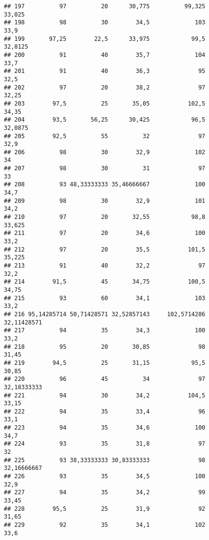 \documentclass[
]{article}
\begin{document}
\begin{verbatim}
## 197          97          20      30,775          99,325               33,025
## 198          98          30        34,5             103                 33,9
## 199       97,25        22,5      33,975            99,5              32,8125
## 200          91          40        35,7             104                 33,7
## 201          91          40        36,3              95                 32,5
## 202          97          20        38,2              97                32,25
## 203        97,5          25       35,05           102,5                34,35
## 204        93,5       56,25      30,425            96,5              32,0875
## 205        92,5          55          32              97                 32,9
## 206          98          30        32,9             102                   34
## 207          98          30          31              97                   33
## 208          93 48,33333333 35,46666667             100                 34,7
## 209          98          30        32,9             101                 34,2
## 210          97          20       32,55            98,8               33,625
## 211          97          20        34,6             100                 33,2
## 212          97          20        35,5           101,5               35,225
## 213          91          40        32,2              97                 32,2
## 214        91,5          45       34,75           100,5                34,75
## 215          93          60        34,1             103                 33,2
## 216 95,14285714 50,71428571 32,52857143     102,5714286          32,11428571
## 217          94          35        34,3             100                 33,2
## 218          95          20       30,85              98                31,45
## 219        94,5          25       31,15            95,5                30,85
## 220          96          45          34              97          32,18333333
## 221          94          30        34,2           104,5                33,15
## 222          94          35        33,4              96                 33,1
## 223          94          35        34,6             100                 34,7
## 224          93          35        31,8              97                   32
## 225          93 38,33333333 30,83333333              98          32,16666667
## 226          93          35        34,5             100                 32,9
## 227          94          35        34,2              99                33,45
## 228        95,5          25        31,9              92                31,65
## 229          92          35        34,1             102                 33,6

\end{verbatim}
\end{document}
